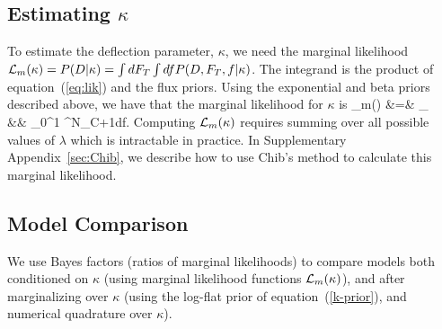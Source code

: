 \subsection{Estimating $\kappa$}

To estimate the deflection parameter, $\kappa$, we need the marginal
likelihood ${\cal L}_m(\kappa) = P(D|\kappa) = \int dF_T\int df
P(D,F_T,f|\kappa)$.  The integrand is the product of equation~(\ref{eq:lik})
and the flux priors.  Using the exponential and beta priors described above,
we have that the marginal likelihood for $\kappa$ is
\ba
\like_m(\kappa)
  &=& \sum_\lambda {}\nonumber\\
  &&  \times\int_0^1
           {^{N_C+1}}df.
\label{eq:marg}
\ea
Computing ${\cal L}_m(\kappa)$ requires summing over all possible values of
$\lambda$ which is intractable in practice.  In Supplementary
Appendix~\ref{sec:Chib}, we describe how to use Chib's method
\cite{MR1379473} to calculate this marginal likelihood.

\subsection{Model Comparison}


We use Bayes factors (ratios of marginal likelihoods) to compare models both
conditioned on $\kappa$ (using marginal likelihood functions
${\cal L}_m(\kappa)$), and after marginalizing over $\kappa$ (using the log-flat
prior of equation~(\ref{k-prior}), and numerical quadrature over
$\kappa$).

